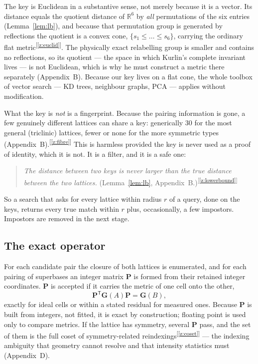 \documentclass[11pt]{article}
\newcommand{\Gmet}{\mathbf{G}}
\newcommand{\Pop}{\mathbf{P}}
\newcommand{\chk}[1]{\textsuperscript{[\ref{#1}]}}
\begin{document}
The key is Euclidean in a substantive sense, not merely because it is a vector. Its distance equals the quotient distance of $\mathbb R^6$ by \emph{all} permutations of the six entries (Lemma~\ref{lem:lb}), and because that permutation group is generated by reflections the quotient is a convex cone, $\{s_1\le\dots\le s_6\}$, carrying the ordinary flat metric\chk{z:euclid}. The physically exact relabelling group is smaller and contains no reflections, so its quotient --- the space in which Kurlin's complete invariant lives --- is not Euclidean, which is why he must construct a metric there separately (Appendix~B). Because our key lives on a flat cone, the whole toolbox of vector search --- KD trees, neighbour graphs, PCA --- applies without modification.

What the key is \emph{not} is a fingerprint. Because the pairing information is gone, a few genuinely different lattices can share a key: generically 30 for the most general (triclinic) lattices, fewer or none for the more symmetric types (Appendix~B).\chk{z:fibre} This is harmless provided the key is never used as a proof of identity, which it is not. It is a filter, and it is a safe one:

\begin{quote}
\emph{The distance between two keys is never larger than the true distance between the two lattices.} (Lemma~\ref{lem:lb}, Appendix~B.)\chk{z:lowerbound}
\end{quote}

So a search that asks for every lattice within radius $r$ of a query, done on the keys, returns every true match within $r$ plus, occasionally, a few impostors. Impostors are removed in the next stage.

\subsection{The exact operator}

For each candidate pair the closure of both lattices is enumerated, and for each pairing of superbases an integer matrix $\Pop$ is formed from their retained integer coordinates. $\Pop$ is accepted if it carries the metric of one cell onto the other,
\[
\Pop^{\mathsf T}\Gmet(A)\Pop=\Gmet(B),
\]
exactly for ideal cells or within a stated residual for measured ones. Because $\Pop$ is built from integers, not fitted, it is exact by construction; floating point is used only to compare metrics. If the lattice has symmetry, several $\Pop$ pass, and the set of them is the full coset of symmetry-related reindexings\chk{z:coset} --- the indexing ambiguity that geometry cannot resolve and that intensity statistics must (Appendix~D).
\end{document}
